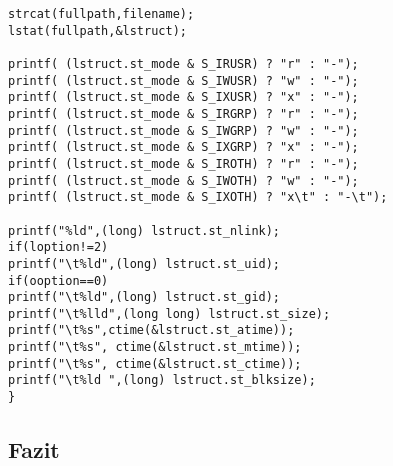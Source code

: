 \begin{lstlisting}
strcat(fullpath,filename);
lstat(fullpath,&lstruct);

printf( (lstruct.st_mode & S_IRUSR) ? "r" : "-");
printf( (lstruct.st_mode & S_IWUSR) ? "w" : "-");
printf( (lstruct.st_mode & S_IXUSR) ? "x" : "-");
printf( (lstruct.st_mode & S_IRGRP) ? "r" : "-");
printf( (lstruct.st_mode & S_IWGRP) ? "w" : "-");
printf( (lstruct.st_mode & S_IXGRP) ? "x" : "-");
printf( (lstruct.st_mode & S_IROTH) ? "r" : "-");
printf( (lstruct.st_mode & S_IWOTH) ? "w" : "-");
printf( (lstruct.st_mode & S_IXOTH) ? "x\t" : "-\t");

printf("%ld",(long) lstruct.st_nlink);
if(loption!=2)
printf("\t%ld",(long) lstruct.st_uid);
if(ooption==0)
printf("\t%ld",(long) lstruct.st_gid);
printf("\t%lld",(long long) lstruct.st_size);
printf("\t%s",ctime(&lstruct.st_atime));
printf("\t%s", ctime(&lstruct.st_mtime));
printf("\t%s", ctime(&lstruct.st_ctime));
printf("\t%ld ",(long) lstruct.st_blksize);
}
\end{lstlisting}




\subsection{Fazit}
